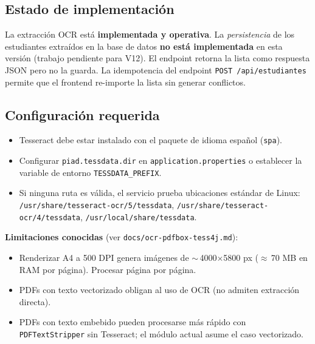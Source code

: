 \documentclass[11pt,a4paper,oneside]{article}
\newcommand{\code}[1]{\texttt{\small #1}}
\begin{document}
\subsection{Estado de implementación}

\begin{ataraNota}
La extracción OCR está \textbf{implementada y operativa}. La \emph{persistencia} de los
estudiantes extraídos en la base de datos \textbf{no está implementada} en esta versión
(trabajo pendiente para V12). El endpoint retorna la lista como respuesta JSON pero no la
guarda. La idempotencia del endpoint \code{POST /api/estudiantes} permite que el frontend
re-importe la lista sin generar conflictos.
\end{ataraNota}

\subsection{Configuración requerida}

\begin{itemize}[leftmargin=*]
  \item Tesseract debe estar instalado con el paquete de idioma español (\code{spa}).
  \item Configurar \code{piad.tessdata.dir} en \code{application.properties} o establecer la
        variable de entorno \code{TESSDATA\_PREFIX}.
  \item Si ninguna ruta es válida, el servicio prueba ubicaciones estándar de Linux:
        \code{/usr/share/tesseract-ocr/5/tessdata}, \code{/usr/share/tesseract-ocr/4/tessdata},
        \code{/usr/local/share/tessdata}.
\end{itemize}

\textbf{Limitaciones conocidas} (ver \code{docs/ocr-pdfbox-tess4j.md}):

\begin{itemize}[leftmargin=*]
  \item Renderizar A4 a 500 DPI genera imágenes de $\sim$\,4000$\times$5800 px ($\approx$\,70 MB
        en RAM por página). Procesar página por página.
  \item PDFs con texto vectorizado obligan al uso de OCR (no admiten extracción directa).
  \item PDFs con texto embebido pueden procesarse más rápido con \code{PDFTextStripper} sin
        Tesseract; el módulo actual asume el caso vectorizado.
\end{itemize}

\end{document}
